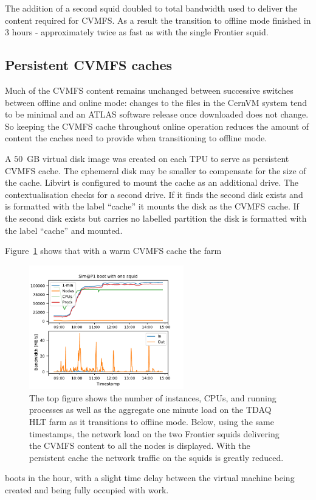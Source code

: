 \documentclass{webofc}
\begin{document}
The addition of a second squid doubled to total bandwidth used to deliver the
content required for CVMFS. As a result the transition to offline mode finished
in 3 hours - approximately twice as fast as with the single Frontier squid.


\subsection{Persistent CVMFS caches}
\label{sec:cvmfs}
Much of the CVMFS content remains unchanged between successive switches between
offline and online mode: changes to the files in the CernVM system tend to be
minimal and an ATLAS software release once downloaded does not change. So
keeping the CVMFS cache throughout online operation reduces the
amount of content the caches need to provide when transitioning to offline mode.

A $50$~\textrm{GB} virtual disk image was created on each TPU to serve as
persistent CVMFS cache. The ephemeral disk may be smaller to
compensate for the size of the cache. Libvirt is configured to mount the cache
as an additional drive. The contextualisation checks for a second drive. If it
finds the second disk exists and is formatted with the label ``cache'' it
mounts the disk as the CVMFS cache. If the second disk exists but carries no
labelled partition the disk is formatted with the label ``cache'' and mounted.

Figure~\ref{fig:persistent_cache} shows that with a warm CVMFS cache the farm
\begin{figure}[h]
\centering
\sidecaption
\includegraphics[width=0.6\textwidth,clip]{persistent_cache}
\caption{The top figure shows the number of instances, CPUs, and running
processes as well as the aggregate one minute load on the TDAQ HLT farm as it
transitions to offline mode. Below, using the same timestamps, the network load
on the two Frontier squids delivering the CVMFS content to all the nodes is
displayed. With the persistent cache the network traffic on the squids
is greatly reduced.}
\label{fig:persistent_cache}
\end{figure}
boots in the hour, with a slight time delay between the virtual machine being
created and being fully occupied with work.
\end{document}
